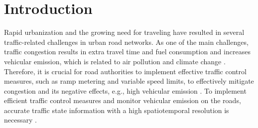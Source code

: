 \documentclass[english]{kththesis}
\begin{document}
\chapter{Introduction}
\label{ch:introduction}

Rapid urbanization and the growing need for traveling have resulted in several traffic-related challenges in urban road networks. As one of the main challenges, traffic congestion results in extra travel time and fuel consumption and increases vehicular emission, which is related to air pollution and climate change \cite{barth_co2, seo_tse}. Therefore, it is crucial for road authorities to implement effective traffic control measures, such as ramp metering and variable speed limits, to effectively mitigate congestion and its negative effects, e.g., high vehicular emission \cite{seo_tse, tsanakas_emission_estimation}. To implement efficient traffic control measures and monitor vehicular emission on the roads, accurate traffic state information with a high spatiotemporal resolution is necessary \cite{seo_tse, tsanakas_emission_estimation}.
\end{document}
